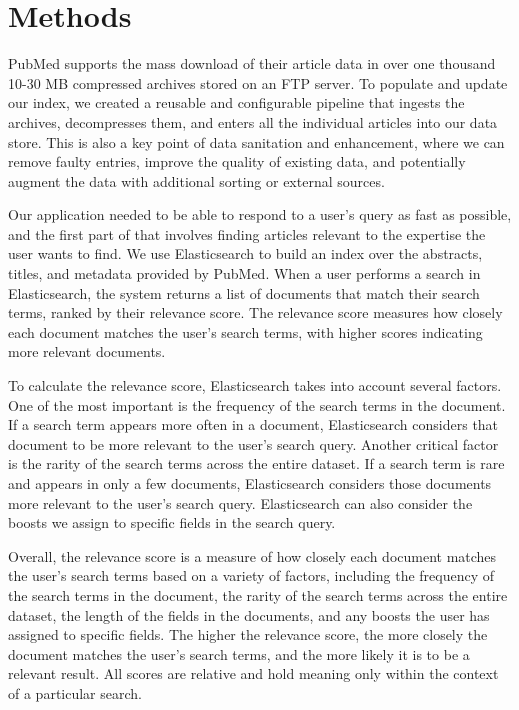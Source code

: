 \section{Methods}

PubMed supports the mass download of their article data in over one thousand 10-30 MB compressed archives stored on an FTP server. To populate and update our index, we created a reusable and configurable pipeline that ingests the archives, decompresses them, and enters all the individual articles into our data store. This is also a key point of data sanitation and enhancement, where we can remove faulty entries, improve the quality of existing data, and potentially augment the data with additional sorting or external sources. 

Our application needed to be able to respond to a user's query as fast as possible, and the first part of that involves finding articles relevant to the expertise the user wants to find. We use Elasticsearch to build an index over the abstracts, titles, and metadata provided by PubMed. When a user performs a search in Elasticsearch, the system returns a list of documents that match their search terms, ranked by their relevance score. The relevance score measures how closely each document matches the user's search terms, with higher scores indicating more relevant documents. 

To calculate the relevance score, Elasticsearch takes into account several factors. One of the most important is the frequency of the search terms in the document. If a search term appears more often in a document, Elasticsearch considers that document to be more relevant to the user's search query. Another critical factor is the rarity of the search terms across the entire dataset. If a search term is rare and appears in only a few documents, Elasticsearch considers those documents more relevant to the user's search query. Elasticsearch can also consider the boosts we assign to specific fields in the search query. 

Overall, the relevance score is a measure of how closely each document matches the user's search terms based on a variety of factors, including the frequency of the search terms in the document, the rarity of the search terms across the entire dataset, the length of the fields in the documents, and any boosts the user has assigned to specific fields. The higher the relevance score, the more closely the document matches the user's search terms, and the more likely it is to be a relevant result. All scores are relative and hold meaning only within the context of a particular search. 

